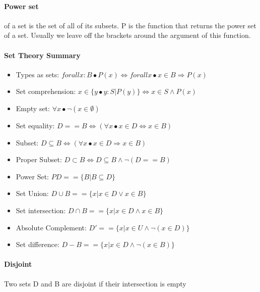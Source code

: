 \documentclass[12pt]{report}
\begin{document}
    \paragraph{Power set} of a set is the set of all of its subsets. P is the
    function that returns the power set of a set. Usually we leave off the
    brackets around the argument of this function.

    \paragraph{Set Theory Summary}
    \begin{itemize}
      \item Types as sets: $ forall x : B \bullet P(x) \Leftrightarrow forall x
        \bullet x \in B \Rightarrow P(x) $
      \item Set comprehension: $ x \in \{ y \bullet y : S | P(y) \}
        \Leftrightarrow x \in S \land P(x) $
      \item Empty set: $ \forall x \bullet \lnot ( x \in \emptyset ) $
      \item Set equality: $ D == B \Leftrightarrow ( \forall x \bullet x \in D
        \Leftrightarrow x \in B ) $
      \item Subset: $ D \subseteq B \Leftrightarrow ( \forall x \bullet x \in D
        \Rightarrow x \in B ) $
      \item Proper Subset: $ D \subset B \Leftrightarrow D \subseteq B \land
        \lnot ( D == B ) $
      \item Power Set: $ PD == \{ B | B \subseteq D \} $
      \item Set Union: $ D \cup B == \{ x | x \in D \lor x \in B \} $
      \item Set intersection: $ D \cap B == \{ x | x \in D \land x \in B \} $
      \item Absolute Complement: $D' == \{ x | x \in U \land \lnot ( x \in D )
        \} $
      \item Set difference: $ D - B == \{ x | x \in D \land \lnot ( x \in B )
        \} $
    \end{itemize}

    \paragraph{Disjoint} Two sets D and B are disjoint if their intersection is
    empty
\end{document}
